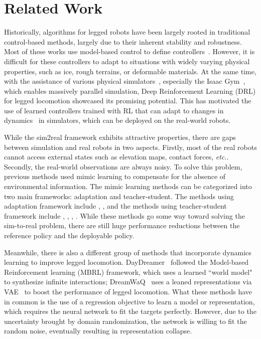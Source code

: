 \section{Related Work}

Historically, algorithms for legged robots have been largely rooted in traditional control-based methods, largely due to their inherent stability and robustness. Most of these works use model-based control to define controllers~\citep{7443018, xiang2010physics, yin2007simbicon, sreenath2011compliant, hutter2016anymal, bledt2018cheetah}. However, it is difficult for these controllers to adapt to situations with widely varying physical properties, such as ice, rough terrains, or deformable materials. At the same time, with the assistance of various physical simulators~\citep{todorov2012mujoco, panerati2021learning}, especially the Isaac Gym~\citep{makoviychuk2021isaac}, which enables massively parallel simulation, Deep Reinforcement Learning (DRL) for legged locomotion showcased its promising potential. This has motivated the use of learned controllers trained with RL that can adapt to changes in dynamics~\citep{tan2018sim, lee2020learning, kumar2021rma, fu2021minimizing, rudin2022learning} in simulators, which can be deployed on the real-world robots.

While the sim2real framework exhibits attractive properties, there are gaps between simulation and real robots in two aspects. Firstly, most of the real robots cannot access external states such as elevation maps, contact forces, \emph{etc.}. Secondly, the real-world observations are always noisy. To solve this problem, previous methods used mimic learning to compensate for the absence of environmental information. The mimic learning methods can be categorized into two main frameworks: adaptation and teacher-student. The methods using adaptation framework include \cite{kumar2021rma}, \cite{agrawal2022vision}, \cite{margolis2023walk} and the methods using teacher-student framework include \cite{lee2020learning}, \cite{chen2019lbc}, \cite{margolis2022rapid}, \cite{wu2023learning}. While these methods go some way toward solving the sim-to-real problem, there are still huge performance reductions between the reference policy and the deployable policy.

Meanwhile, there is also a different group of methods that incorporate dynamics learning to improve legged locomotion. DayDreamer~\citep{wu2023daydreamer} followed the Model-based Reinforcement learning (MBRL) framework, which uses a learned ``world model" to synthesize infinite interactions; DreamWaQ~\citep{nahrendra2023dreamwaq} uses a leaned representations via VAE~\citep{kingma2014auto} to boost the performance of legged locomotion. What these methods have in common is the use of a regression objective to learn a model or representation, which requires the neural network to fit the targets perfectly. However, due to the uncertainty brought by domain randomization, the network is willing to fit the random noise, eventually resulting in representation collapse.

